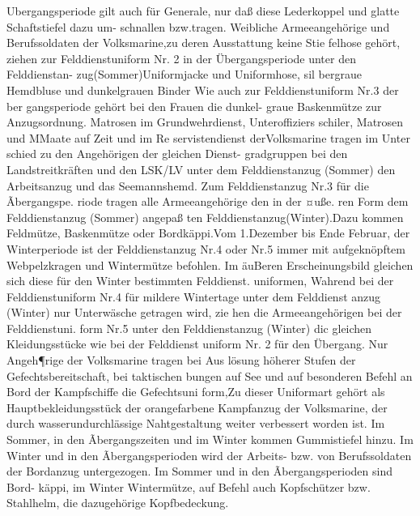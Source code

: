 Ubergangsperiode gilt auch für Generale, nur daß
diese Lederkoppel und glatte Schaftstiefel dazu um-
schnallen bzw.tragen.
Weibliche Armeeangehörige und Berufssoldaten
der Volksmarine,zu deren Ausstattung keine Stie
felhose gehört, ziehen zur Felddienstuniform Nr. 2
in der Übergangsperiode unter den Felddienstan-
zug(Sommer)Uniformjacke und Uniformhose, sil
bergraue Hemdbluse und dunkelgrauen Binder
Wie auch zur Felddienstuniform Nr.3 der ber
gangsperiode gehört bei den Frauen die dunkel-
graue Baskenmütze zur Anzugsordnung.
Matrosen im Grundwehrdienst, Unteroffiziers
schiler, Matrosen und MMaate auf Zeit und im Re
servistendienst derVolksmarine tragen im Unter
schied zu den Angehörigen der gleichen Dienst-
gradgruppen bei den Landstreitkräften und den
LSK/LV unter dem Felddienstanzug (Sommer) den
Arbeitsanzug und das Seemannshemd.
Zum Felddienstanzug Nr.3 für die Ãbergangspe.
riode tragen alle Armeeangehörige den in der ¤uße.
ren Form dem Felddienstanzug (Sommer) angepaß
ten Felddienstanzug(Winter).Dazu kommen
Feldmütze, Baskenmütze oder Bordkäppi.Vom
1.Dezember bis Ende Februar, der Winterperiode
ist der Felddienstanzug Nr.4 oder Nr.5 immer mit
aufgeknöpftem Webpelzkragen und Wintermütze
befohlen. Im äuBeren Erscheinungsbild gleichen
sich diese für den Winter bestimmten Felddienst.
uniformen, Wahrend bei der Felddienstuniform
Nr.4 für mildere Wintertage unter dem Felddienst
anzug (Winter) nur Unterwäsche getragen wird, zie
hen die Armeeangehörigen bei der Felddienstuni.
form Nr.5 unter den Felddienstanzug (Winter) dic
gleichen Kleidungsstücke wie bei der Felddienst
uniform Nr. 2 für den Übergang.
Nur Angeh¶rige der Volksmarine tragen bei Aus
lösung höherer Stufen der Gefechtsbereitschaft, bei
taktischen bungen auf See und auf besonderen
Befehl an Bord der Kampfschiffe die Gefechtsuni
form,Zu dieser Uniformart gehört als Hauptbekleidungsstück der orangefarbene Kampfanzug
der
Volksmarine, der durch
wasserundurchlässige
Nahtgestaltung weiter verbessert worden ist. Im
Sommer, in den Ãbergangszeiten und im Winter
kommen Gummistiefel hinzu. Im Winter und in
den Ãbergangsperioden wird der Arbeits- bzw. von
Berufssoldaten der Bordanzug untergezogen. Im
Sommer und in den Ãbergangsperioden sind Bord-
käppi, im Winter Wintermütze, auf Befehl auch
Kopfschützer bzw. Stahlhelm, die dazugehörige
Kopfbedeckung.